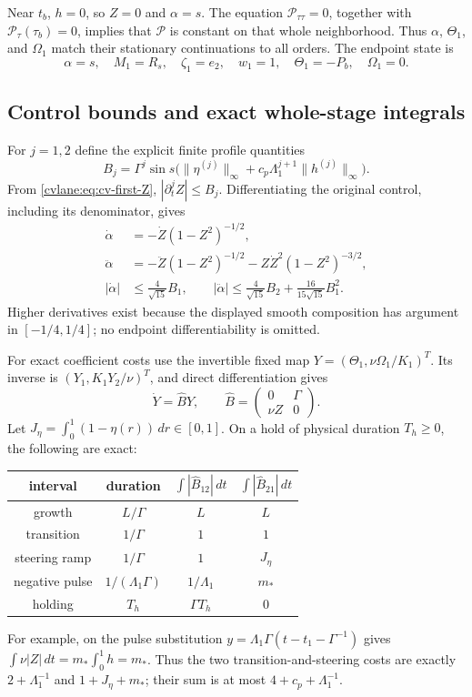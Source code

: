 Near $t_b$, $h=0$, so $Z=0$ and $\alpha=s$.
The equation $\mathcal P_{\tau\tau}=0$, together with
$\mathcal P_\tau(\tau_b)=0$, implies that $\mathcal P$ is constant
on that whole neighborhood. Thus $\alpha$, $\Theta_1$, and $\Omega_1$
match their stationary continuations to all orders. The endpoint state is
\begin{equation}
 \alpha=s,\quad M_1=R_s,\quad\zeta_1=e_2,\quad
 w_1=1,\quad\Theta_1=-P_b,\quad\Omega_1=0.
 \label{cvlane:eq:cv-first-endpoint}
\end{equation}

\subsection{Control bounds and exact whole-stage integrals}

For $j=1,2$ define the explicit finite profile quantities
\[
 B_j=\Gamma^j\sin s\bigl(\|\eta^{(j)}\|_\infty
            +c_p\Lambda_1^{j+1}\|h^{(j)}\|_\infty\bigr).
\]
From \eqref{cvlane:eq:cv-first-Z}, $|\partial_t^jZ|\leq B_j$.
Differentiating the original control, including its denominator, gives
\begin{align}
 \dot\alpha&=-\dot Z(1-Z^2)^{-1/2},\\
 \ddot\alpha&=-\ddot Z(1-Z^2)^{-1/2}
              -Z\dot Z^2(1-Z^2)^{-3/2},\nonumber\\
 |\dot\alpha|&\leq\frac4{\sqrt{15}}B_1,\qquad
 |\ddot\alpha|\leq\frac4{\sqrt{15}}B_2
                    +\frac{16}{15\sqrt{15}}B_1^2.
 \label{cvlane:eq:cv-first-control-bounds}
\end{align}
Higher derivatives exist because the displayed smooth composition has
argument in $[-1/4,1/4]$; no endpoint differentiability is omitted.

For exact coefficient costs use the invertible fixed map
$Y=(\Theta_1,\nu\Omega_1/K_1)^T$. Its inverse is
$(Y_1,K_1Y_2/\nu)^T$, and direct differentiation gives
\[
 \dot Y=\widehat B Y,\qquad
 \widehat B=\begin{pmatrix}0&\Gamma\\\nu Z&0\end{pmatrix}.
\]
Let $J_\eta=\int_0^1(1-\eta(r))\,dr\in[0,1]$.
On a hold of physical duration $T_h\geq0$, the following are exact:
\begin{center}
\begin{tabular}{c|c|c|c}
interval&duration&$\int|\widehat B_{12}|\,dt$
                      &$\int|\widehat B_{21}|\,dt$\\\hline
growth&$L/\Gamma$&$L$&$L$\\
transition&$1/\Gamma$&$1$&$1$\\
steering ramp&$1/\Gamma$&$1$&$J_\eta$\\
negative pulse&$1/(\Lambda_1\Gamma)$&$1/\Lambda_1$&$m_*$\\
holding&$T_h$&$\Gamma T_h$&$0$
\end{tabular}
\end{center}
For example, on the pulse substitution
$y=\Lambda_1\Gamma(t-t_1-\Gamma^{-1})$ gives
$\int\nu|Z|\,dt=m_*\int_0^1h=m_*$.
Thus the two transition-and-steering costs are exactly
$2+\Lambda_1^{-1}$ and $1+J_\eta+m_*$;
their sum is at most $4+c_p+\Lambda_1^{-1}$.

